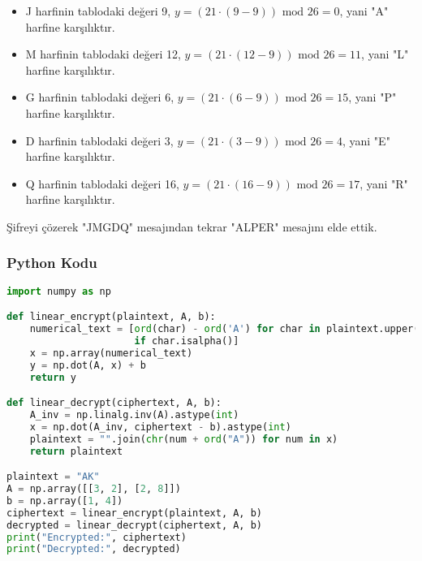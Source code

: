 \begin{itemize}
    \item J harfinin tablodaki değeri 9, $y = (21 \cdot (9 - 9)) \text{ mod } 26 = 0$, yani "A" harfine karşılıktır.
    \item M harfinin tablodaki değeri 12, $y = (21 \cdot (12 - 9)) \text{ mod } 26 = 11$, yani "L" harfine karşılıktır.
    \item G harfinin tablodaki değeri 6, $y = (21 \cdot (6 - 9)) \text{ mod } 26 = 15$, yani "P" harfine karşılıktır.
    \item D harfinin tablodaki değeri 3, $y = (21 \cdot (3 - 9)) \text{ mod } 26 = 4$, yani "E" harfine karşılıktır.
    \item Q harfinin tablodaki değeri 16, $y = (21 \cdot (16 - 9)) \text{ mod } 26 = 17$, yani "R" harfine karşılıktır.
\end{itemize}

Şifreyi çözerek "JMGDQ" mesajından tekrar "ALPER" mesajını elde ettik.

\subsubsection{Python Kodu}

\begin{lstlisting}[language=Python]
import numpy as np

def linear_encrypt(plaintext, A, b):
    numerical_text = [ord(char) - ord('A') for char in plaintext.upper()
                      if char.isalpha()]
    x = np.array(numerical_text)
    y = np.dot(A, x) + b
    return y

def linear_decrypt(ciphertext, A, b):
    A_inv = np.linalg.inv(A).astype(int)
    x = np.dot(A_inv, ciphertext - b).astype(int)
    plaintext = "".join(chr(num + ord("A")) for num in x)
    return plaintext

plaintext = "AK"
A = np.array([[3, 2], [2, 8]])
b = np.array([1, 4])
ciphertext = linear_encrypt(plaintext, A, b)
decrypted = linear_decrypt(ciphertext, A, b)
print("Encrypted:", ciphertext)
print("Decrypted:", decrypted)
\end{lstlisting}

\newpage